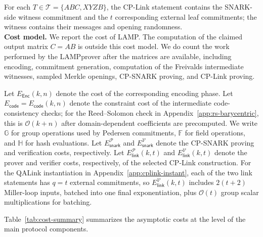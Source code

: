 \documentclass[conference,compsoc]{IEEEtran}
\renewcommand{\enc}{\mathsf{Enc}}   %
\newcommand{\protocol}{\textsf{LAMP}}   %
\theoremstyle{plain}
\theoremstyle{definition}
\theoremstyle{remark}
\providecommand{\DIFaddtex}[1]{{\protect\color{DIFADD} \sf #1}} %
\providecommand{\DIFaddbegin}{} %
\providecommand{\DIFaddend}{} %
\providecommand{\DIFadd}[1]{\texorpdfstring{\DIFaddtex{#1}}{#1}} %
\providecommand{\DIFaddincludegraphics}[2][]{{\color{blue}\fbox{\DIFOincludegraphics[#1]{#2}}}} %
\DeclareRobustCommand{\DIFaddbegin}{\DIFOaddbegin \let\includegraphics\DIFaddincludegraphics} %
\DeclareRobustCommand{\DIFaddend}{\DIFOaddend \let\includegraphics\DIFOincludegraphics} %
\begin{document}
For  \DIFaddbegin \DIFadd{each \(T\in\mathcal{T}=\{ABC,XYZB\}\), the }\DIFaddend CP-Link statement  \DIFaddbegin \DIFadd{contains
the SNARK-side witness commitment and the \(t\) corresponding external leaf
commitments; the witness contains their messages and opening randomness}\DIFaddend .\\

\noindent\textbf{Cost model.}
We report the cost of  \protocol.  The computation of the claimed output matrix \(C=AB\) is outside this cost model.
We do count the work performed by the \protocol prover after the matrices are available, including encoding, commitment generation, computation of the Freivalds intermediate witnesses, sampled Merkle openings, CP-SNARK proving, and CP-Link proving.

Let \(E_{\enc}(k,n)\) denote \DIFaddbegin \DIFadd{the }\DIFaddend cost of the corresponding encoding phase.
Let \(E_{\mathsf{code}}=E_{\mathsf{code}}(k,n)\) denote the constraint cost of the intermediate
code-consistency checks; for the Reed--Solomon check in
Appendix~\ref{app:rs-barycentric}, this is \(\mathcal{O}(k+n)\) after
domain-dependent coefficients are precomputed.
We write \(\mathbb{G}\) for group operations used by Pedersen commitments,
\(\mathbb{F}\) for field operations, and \(\mathbb{H}\) for hash evaluations.
Let \(E_{\mathsf{snark}}^{\mathcal{P}}\) and \(E_{\mathsf{snark}}^{\mathcal{V}}\) denote the CP-SNARK proving and
verification costs, respectively. Let \(E_{\mathsf{link}}^\mathcal{P}(k,t)\) and \(E_{\mathsf{link}}^\mathcal{V}(k,t)\) denote the prover and verifier costs, respectively, of the selected CP-Link construction.
For the QALink instantiation in Appendix~\ref{app:cplink-instant}, each of the
two link statements has \(q=t\) external commitments, so
\(E_{\mathsf{link}}^\mathcal{V}(k,t)\) includes \(2(t+2)\) Miller-loop inputs,
batched into one final exponentiation, plus \(\mathcal{O}(t)\) group scalar
multiplications for batching.

Table~\ref{tab:cost-summary} summarizes the asymptotic costs at the level of the main protocol components. \\
\end{document}
